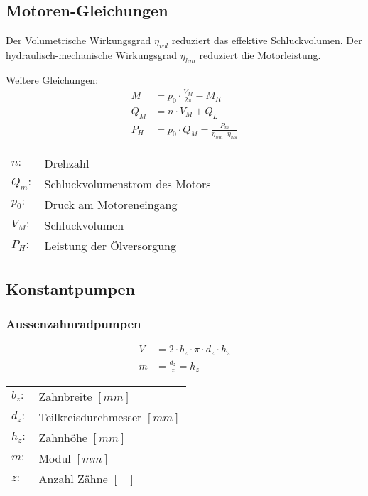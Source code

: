 \subsection{Motoren-Gleichungen}
Der Volumetrische Wirkungsgrad $\eta_{vol}$ reduziert das effektive Schluckvolumen. Der hydraulisch-mechanische Wirkungsgrad $\eta_{hm}$ reduziert die Motorleistung. 


Weitere Gleichungen:
\begin{align*}
M &= p_0 \cdot \frac{V_M}{2 \pi} - M_R \tag{Lastmoment} \\
Q_M &= n \cdot V_M + Q_L \tag{Volumenstrom} \\
P_H &= p_0 \cdot Q_M = \frac{P_m}{\eta_{hm} \cdot \eta_{vol}}
\end{align*}

\begin{tabular}{ll}
$n:$ & Drehzahl \\
$Q_m:$ & Schluckvolumenstrom des Motors\\
$p_0:$ & Druck am Motoreneingang \\
$V_M:$ & Schluckvolumen \\
$P_H:$ & Leistung der Ölversorgung \\
\end{tabular}



\subsection{Konstantpumpen}

\subsubsection{Aussenzahnradpumpen}
\begin{align*}
V &= 2 \cdot b_z \cdot \pi \cdot d_z \cdot h_z \\
m &= \frac{d_z}{z} = h_z
\end{align*}


\begin{tabular}{ll}
$b_z:$ & Zahnbreite $[mm]$\\
$d_z:$& Teilkreisdurchmesser $[mm]$\\
$h_z:$& Zahnhöhe $[mm]$\\
$m:$& Modul $[mm]$\\
$z:$& Anzahl Zähne $[-]$
\end{tabular} \\


